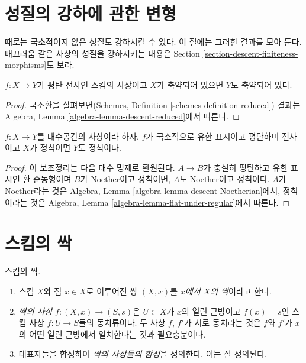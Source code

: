 \section{성질의 강하에 관한 변형}
\label{section-variants}

\noindent
때로는 국소적이지 않은 성질도 강하시킬 수 있다. 이 절에는 그러한 결과를
모아 둔다. 매끄러움 같은 사상의 성질을 강하시키는 내용은 Section
\ref{section-descent-finiteness-morphisms}도 보라.

\begin{lemma}
\label{lemma-descend-reduced}
$f : X \to Y$가 평탄 전사인 스킴의 사상이고 $X$가 축약되어 있으면
$Y$도 축약되어 있다.
\end{lemma}

\begin{proof}
국소환을 살펴보면(Schemes, Definition \ref{schemes-definition-reduced})
결과는 Algebra, Lemma \ref{algebra-lemma-descent-reduced}에서 따른다.
\end{proof}

\begin{lemma}
\label{lemma-descend-regular}
$f : X \to Y$를 대수공간의 사상이라 하자. $f$가 국소적으로 유한
표시이고 평탄하며 전사이고 $X$가 정칙이면 $Y$도 정칙이다.
\end{lemma}

\begin{proof}
이 보조정리는 다음 대수 명제로 환원된다. $A \to B$가 충실히 평탄하고
유한 표시인 환 준동형이며 $B$가 Noether이고 정칙이면, $A$도 Noether이고
정칙이다. $A$가 Noether라는 것은 Algebra, Lemma
\ref{algebra-lemma-descent-Noetherian}에서, 정칙이라는 것은 Algebra, Lemma
\ref{algebra-lemma-flat-under-regular}에서 따른다.
\end{proof}









\section{스킴의 싹}
\label{section-germs}

\begin{definition}
\label{definition-germs}
스킴의 싹.
\begin{enumerate}
\item 스킴 $X$와 점 $x \in X$로 이루어진 쌍 $(X, x)$를
{\it $x$에서 $X$의 싹}이라고 한다.
\item {\it 싹의 사상} $f : (X, x) \to (S, s)$은 $U \subset X$가 $x$의
열린 근방이고 $f(x) = s$인 스킴 사상 $f : U \to S$들의 동치류이다.
두 사상 $f$, $f'$가 서로 동치라는 것은 $f$와 $f'$가 $x$의 어떤 열린
근방에서 일치한다는 것과 필요충분이다.
\item 대표자들을 합성하여 {\it 싹의 사상들의 합성}을 정의한다. 이는
잘 정의된다.
\end{enumerate}
\end{definition}

